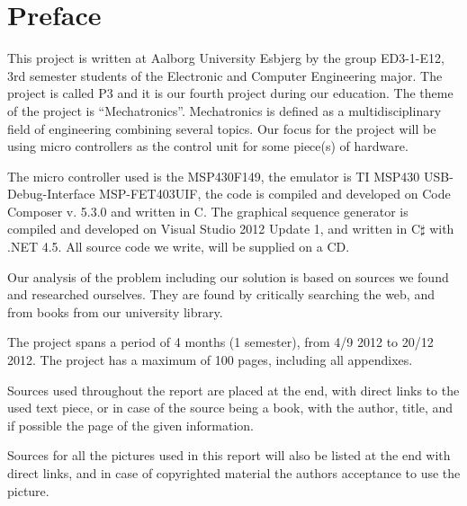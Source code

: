 \chapter*{Preface}
This project is written at Aalborg University Esbjerg by the group ED3-1-E12, 3rd semester students of the Electronic and Computer Engineering major. The project is called P3 and it is our fourth project during our education.
The theme of the project is ``Mechatronics''. Mechatronics is defined as a multidisciplinary field of engineering combining several topics. Our focus for the project will be using micro controllers as the control unit for some piece(s) of hardware.

The micro controller used is the MSP430F149, the emulator is TI MSP430 USB-Debug-Interface MSP-FET403UIF, the code is compiled and developed on Code Composer v. 5.3.0 and written in C.
The graphical sequence generator is compiled and developed on Visual Studio 2012 Update 1, and written in C$\sharp$ with .NET 4.5.
All source code we write, will be supplied on a CD.

Our analysis of the problem including our solution is based on sources we found and researched ourselves. They are found by critically searching the web, and from books from our university library.

The project spans a period of 4 months (1 semester), from 4/9 2012 to 20/12 2012. The project has a maximum of 100 pages, including all appendixes.

Sources used throughout the report are placed at the end, with direct links to the used text piece, or in case of the source being a book, with the author, title, and if possible the page of the given information. 

Sources for all the pictures used in this report will also be listed at the end with direct links, and in case of copyrighted material the authors acceptance to use the picture.


\newpage